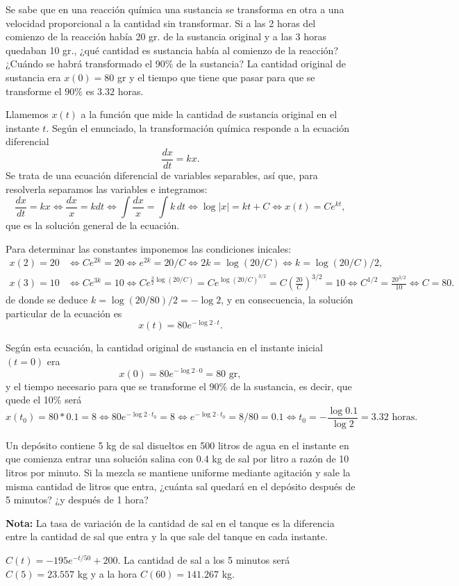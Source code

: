 {Se sabe que en una reacción química una sustancia se transforma en otra a una velocidad  proporcional a la cantidad
sin transformar. Si a las 2 horas del comienzo de la reacción había 20 gr. de la sustancia original y a las 3 horas
quedaban 10 gr., ¿qué cantidad es sustancia había al comienzo de la reacción? ¿Cuándo se habrá transformado el 90\% de
la sustancia?}
{La cantidad original de sustancia era $x(0)=80$  gr y el tiempo que tiene que pasar para que se transforme el $90\%$
es $3.32$ horas.  }
{Llamemos $x(t)$ a la función que mide la cantidad de sustancia original en el instante $t$. Según el enunciado, la
transformación química responde a la ecuación diferencial 
\[
\frac{dx}{dt}=kx.
\]
Se trata de una ecuación diferencial de variables separables, así que, para resolverla separamos las variables e
integramos: 
\[
\frac{dx}{dt}=kx \Leftrightarrow \frac{dx}{x}=kdt \Leftrightarrow \int \frac{dx}{x} = \int k\,dt \Leftrightarrow
\log|x| = kt+C \Leftrightarrow x(t)=Ce^{kt}, 
\]
que es la solución general de la ecuación.

Para determinar las constantes imponemos las condiciones inicales:
\begin{align*}
x(2)=20 &\Leftrightarrow Ce^{2k} = 20 \Leftrightarrow e^{2k} = 20/C \Leftrightarrow 2k =
\log(20/C) \Leftrightarrow k=\log(20/C)/2,\\
x(3)=10 &\Leftrightarrow Ce^{3k} = 10 \Leftrightarrow Ce^{\frac{3}{2}\log(20/C)} = Ce^{\log(20/C)^{3/2}}=
C\left(\frac{20}{C}\right)^{3/2}=10 \Leftrightarrow C^{1/2}=\frac{20^{3/2}}{10} \Leftrightarrow C = 80. 
\end{align*}
de donde se deduce $k=\log(20/80)/2 = -\log 2$, y en consecuencia, la solución particular de la ecuación es
\[
x(t)=80e^{-\log2\cdot t}.
\]

Según esta ecuación, la cantidad original de sustancia en el instante inicial $(t=0)$ era
\[
x(0)=80e^{-\log2\cdot 0} = 80 \mbox{ gr},
\]
y el tiempo necesario para que se transforme el 90\% de la sustancia, es decir, que quede el 10\% será
\[
x(t_{0})=80*0.1=8 \Leftrightarrow 80e^{-\log2\cdot t_{0}}=8 \Leftrightarrow 
e^{-\log2\cdot t_{0}}=8/80=0.1 \Leftrightarrow t_{0}=-\frac{\log0.1}{\log2}=3.32 \mbox{ horas.}
\]
}


{Un depósito contiene 5 kg de sal disueltos en 500 litros de agua en el instante en que comienza entrar una solución
salina con 0.4 kg de sal por litro a razón de 10 litros por minuto. Si la mezcla se mantiene uniforme mediante
agitación y sale la misma cantidad de litros que entra, ¿cuánta sal quedará en el depósito después de 5 minutos? ¿y
después de 1 hora?   

\noindent\textbf{Nota:} La tasa de variación de la cantidad de sal en el tanque es la diferencia entre la cantidad de
sal que entra y la que sale del tanque en cada instante.}
{$C(t)=-195e^{-t/50}+200$. La cantidad de sal a los 5 minutos será $C(5)=23.557$ kg y a la hora $C(60)=141.267$ kg.
}
{}


